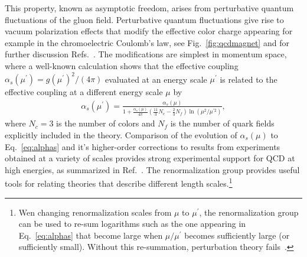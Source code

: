 This property, known as asymptotic freedom, arises from perturbative quantum fluctuations of the gluon field.
Perturbative quantum fluctuations give rise to vacuum polarization effects that modify the effective color charge appearing for example in the chromoelectric Coulomb's law, see Fig.~\ref{fig:qcdmagnet} and for further discussion Refs.~\cite{Appelquist:1977tw,opac-b1131978}.
The modifications are simplest in momentum space, where a well-known calculation shows that the effective coupling $\alpha_s(\mu^\prime) = g(\mu^\prime)^2/(4\pi)$ evaluated at an energy scale $\mu^\prime$ is related to the effective coupling at a different energy scale $\mu$ by~\cite{Politzer:1973fx,Gross:1973id}
\begin{equation}
  \begin{split}
    \alpha_s(\mu^\prime) = \frac{\alpha_s(\mu)}{1 + \frac{\alpha_s(\mu)}{4\pi}(\frac{11}{3}N_c - \frac{2}{3}N_f )\ln(\mu^2/\mu^{\prime 2})},
  \end{split}\label{eq:alphas}
\end{equation}
where $N_c=3$ is the number of colors and $N_f$ is the number of quark fields explicitly included in the theory.
Comparison of the evolution of $\alpha_s(\mu)$ to Eq.~\eqref{eq:alphas} and it's higher-order corrections to results from experiments obtained at a variety of scales provides strong experimental support for QCD at high energies, as summarized in Ref.~\cite{Bethke:2009jm}.
The renormalization group provides useful tools for relating theories that describe different length scales.\footnote{Wen changing renormalization scales from $\mu$ to $\mu^\prime$, the renormalization group can be used to re-sum logarithms such as the one appearing in Eq.~\eqref{eq:alphas} that become large when $\mu/\mu^\prime$ becomes sufficiently large (or sufficiently small). Without this re-summation, perturbation theory fails~\cite{Collins:105730}.}

